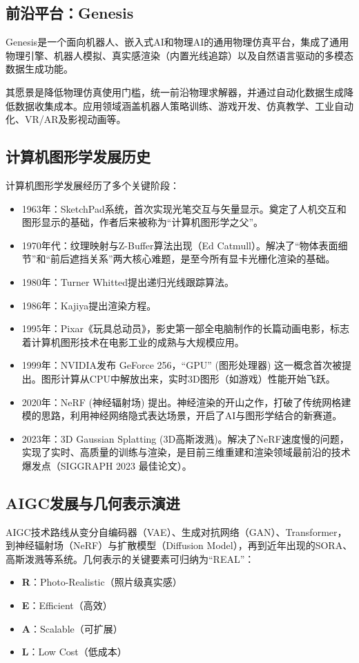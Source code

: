 \documentclass[12pt]{article}
\begin{document}
\subsection{前沿平台：Genesis}

Genesis是一个面向机器人、嵌入式AI和物理AI的通用物理仿真平台，集成了通用物理引擎、机器人模拟、真实感渲染（内置光线追踪）以及自然语言驱动的多模态数据生成功能。

其愿景是降低物理仿真使用门槛，统一前沿物理求解器，并通过自动化数据生成降低数据收集成本。应用领域涵盖机器人策略训练、游戏开发、仿真教学、工业自动化、VR/AR及影视动画等。

\subsection{计算机图形学发展历史}

计算机图形学发展经历了多个关键阶段：
\begin{itemize}
    \item 1963年：SketchPad系统，首次实现光笔交互与矢量显示。奠定了人机交互和图形显示的基础，作者后来被称为“计算机图形学之父”。
    \item 1970年代：纹理映射与Z-Buffer算法出现（Ed Catmull）。解决了“物体表面细节”和“前后遮挡关系”两大核心难题，是至今所有显卡光栅化渲染的基础。
    \item 1980年：Turner Whitted提出递归光线跟踪算法。
    \item 1986年：Kajiya提出渲染方程。
    \item 1995年：Pixar《玩具总动员》，影史第一部全电脑制作的长篇动画电影，标志着计算机图形技术在电影工业的成熟与大规模应用。
    \item 1999年：NVIDIA发布 GeForce 256，“GPU” (图形处理器) 这一概念首次被提出。图形计算从CPU中解放出来，实时3D图形（如游戏）性能开始飞跃。
    \item 2020年：NeRF (神经辐射场) 提出。神经渲染的开山之作，打破了传统网格建模的思路，利用神经网络隐式表达场景，开启了AI与图形学结合的新赛道。
    \item 2023年：3D Gaussian Splatting (3D高斯泼溅)。解决了NeRF速度慢的问题，实现了实时、高质量的训练与渲染，是目前三维重建和渲染领域最前沿的技术爆发点（SIGGRAPH 2023 最佳论文）。
\end{itemize}

\subsection{AIGC发展与几何表示演进}

AIGC技术路线从变分自编码器（VAE）、生成对抗网络（GAN）、Transformer，到神经辐射场（NeRF）与扩散模型（Diffusion Model），再到近年出现的SORA、高斯泼溅等系统。几何表示的关键要素可归纳为“REAL”：
\begin{itemize}
    \item \textbf{R}：Photo-Realistic（照片级真实感）
    \item \textbf{E}：Efficient（高效）
    \item \textbf{A}：Scalable（可扩展）
    \item \textbf{L}：Low Cost（低成本）
\end{itemize}
\end{document}
